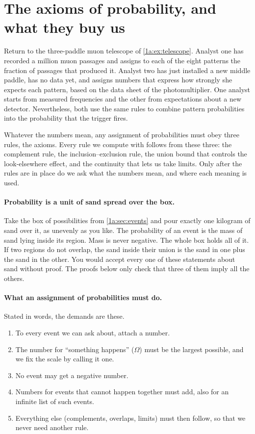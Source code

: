 \section{The axioms of probability, and what they buy us}
\label{1a:sec:axioms}

Return to the three-paddle muon telescope of \cref{1a:ex:telescope}. Analyst
one has recorded a million muon passages and assigns to each of the eight
patterns the fraction of passages that produced it. Analyst two has just
installed a new middle paddle, has no data yet, and assigns numbers that
express how strongly she expects each pattern, based on the data sheet of the
photomultiplier. One analyst starts from measured frequencies and the other from expectations
about a new detector. Nevertheless, both use the same rules to combine pattern
probabilities into the probability that the trigger fires.

Whatever the numbers mean, any assignment of probabilities must obey three
rules, the axioms. Every rule we compute with follows from these three: the
complement rule, the inclusion--exclusion rule, the union bound that controls
the look-elsewhere effect, and the continuity that lets us take limits. Only
after the rules are in place do we ask what the numbers mean, and where each
meaning is used.

\paragraph{Probability is a unit of sand spread over the box.}
Take the box of possibilities from \cref{1a:sec:events} and pour exactly one
kilogram of sand over it, as unevenly as you like. The probability of an event
is the mass of sand lying inside its region. Mass is never negative. The whole
box holds all of it. If two regions do not overlap, the sand inside their union
is the sand in one plus the sand in the other. You would accept every one of
these statements about sand without proof. The proofs below only check that
three of them imply all the others.

\paragraph{What an assignment of probabilities must do.}
Stated in words, the demands are these.
\begin{enumerate}[leftmargin=1.5em,itemsep=1pt]
  \item To every event we can ask about, attach a number.
  \item The number for ``something happens'' ($\Omega$) must be the largest
        possible, and we fix the scale by calling it one.
  \item No event may get a negative number.
  \item Numbers for events that cannot happen together must add, also for an
        infinite list of such events.
  \item Everything else (complements, overlaps, limits) must then follow, so
        that we never need another rule.
\end{enumerate}

